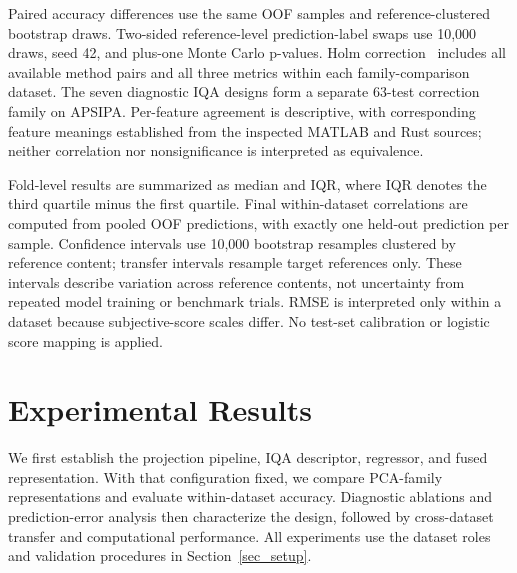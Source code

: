 \documentclass[final,3p,times,twocolumn]{elsarticle}
\begin{document}
Paired accuracy differences use the same \gls{OOF} samples and reference-clustered bootstrap draws. Two-sided reference-level prediction-label swaps use 10,000 draws, seed 42, and plus-one Monte Carlo p-values. Holm correction~\cite{holm1979simple} includes all available method pairs and all three metrics within each family-comparison dataset. The seven diagnostic IQA designs form a separate 63-test correction family on APSIPA. Per-feature agreement is descriptive, with corresponding feature meanings established from the inspected MATLAB and Rust sources; neither correlation nor nonsignificance is interpreted as equivalence. %

Fold-level results are summarized as median and \gls{IQR}, where \gls{IQR} denotes the third quartile minus the first quartile. Final within-dataset correlations are computed from pooled \gls{OOF} predictions, with exactly one held-out prediction per sample. Confidence intervals use 10,000 bootstrap resamples clustered by reference content; transfer intervals resample target references only. These intervals describe variation across reference contents, not uncertainty from repeated model training or benchmark trials. \gls{RMSE} is interpreted only within a dataset because subjective-score scales differ. No test-set calibration or logistic score mapping is applied.












\section{Experimental Results} \label{sec_results}










We first establish the projection pipeline, \gls{IQA} descriptor, regressor, and fused representation. With that configuration fixed, we compare \gls{PCA}-family representations and evaluate within-dataset accuracy. Diagnostic ablations and prediction-error analysis then characterize the design, followed by cross-dataset transfer and computational performance. All experiments use the dataset roles and validation procedures in Section~\ref{sec_setup}.
\end{document}
